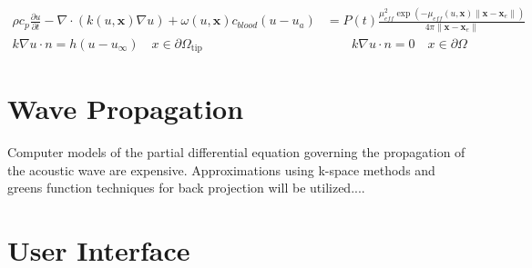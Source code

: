 \documentclass{article}         %
\theoremstyle{definition}
\theoremstyle{remark}
\begin{document}
\[
\begin{split}
 \rho  c_p \frac{\partial u}{\partial t}
 -\nabla \cdot ( k(u,\textbf{x}) \nabla u) 
 +\omega(u,\textbf{x})c_{blood} (u - u_a )
  &  = 
 P(t)
   \frac{\mu_{eff}^2 \exp(-\mu_{eff}(u,\textbf{x})  
         \|\textbf{x} -\textbf{x}_e\|) }
      {4\pi \|\textbf{x}-\textbf{x}_e\|}
\\
 k \nabla u \cdot n    = h (u - u_\infty)  \quad x \in \partial \Omega_\text{tip}
\qquad & \qquad
 k \nabla u \cdot n    = 0                 \quad x \in \partial \Omega
\end{split}
\]

\section{Wave Propagation}\label{WavePropagation}

Computer models of the partial differential equation governing the
propagation of the acoustic wave are expensive. Approximations using k-space
methods and greens function techniques for back projection will be
utilized....

\section{User Interface}\label{UserInterface}
\nocite{*}


\end{document}
